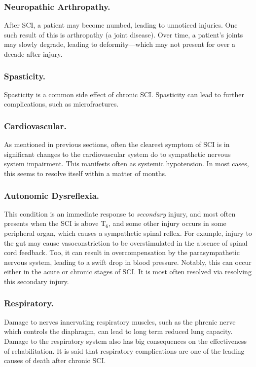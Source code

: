\documentclass[12pt]{report}
\begin{document}
\subsubsection{Neuropathic Arthropathy.}
After SCI, a patient may become numbed, leading to unnoticed injuries. One such result of this is arthropathy (a joint disease). Over time, a patient's joints may slowly degrade, leading to deformity---which may not present for over a decade after injury. 

\subsubsection{Spasticity.}
Spasticity is a common side effect of chronic SCI. Spasticity can lead to further complications, such as microfractures. 

\subsubsection{Cardiovascular.}
As mentioned in previous sections, often the clearest symptom of SCI is in significant changes to the cardiovascular system do to sympathetic nervous system impairment. This manifests often as systemic hypotension. In most cases, this seems to resolve itself within a matter of months. 

\subsubsection{Autonomic Dysreflexia.}
This condition is an immediate response to \textit{secondary} injury, and most often presents when the SCI is above T$_6$, and some other injury occurs in some peripheral organ, which causes a sympathetic spinal reflex. For example, injury to the gut may cause vasoconstriction to be overstimulated in the absence of spinal cord feedback. Too, it can result in overcompensation by the parasympathetic nervous system, leading to a swift drop in blood pressure. Notably, this can occur either in the acute or chronic stages of SCI. It is most often resolved via resolving this secondary injury. 

\subsubsection{Respiratory.}
Damage to nerves innervating respiratory muscles, such as the phrenic nerve which controls the diaphragm, can lead to long term reduced lung capacity. Damage to the respiratory system also has big consequences on the effectiveness of rehabilitation. It is said that respiratory complications are one of the leading causes of death after chronic SCI.
\end{document}
